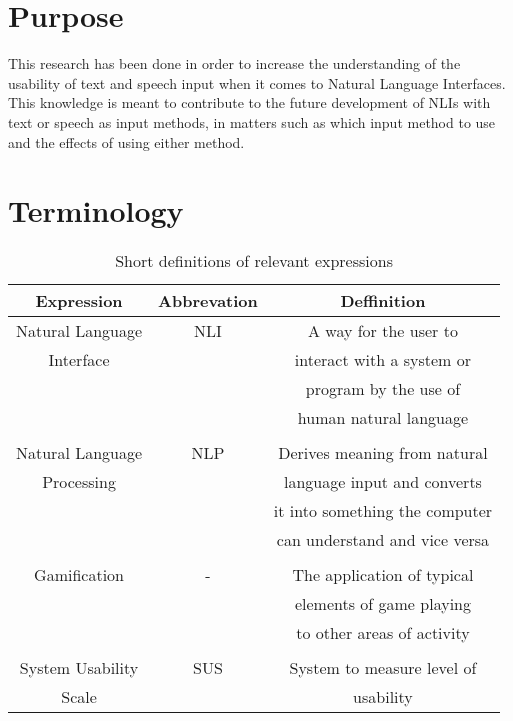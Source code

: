 \section{Purpose}
This research has been done in order to increase the understanding of the usability of text and speech input when it comes to Natural Language Interfaces. This knowledge is meant to contribute to the future development of NLIs with text or speech as input methods, in matters such as which input method to use and the effects of using either method.


\section{Terminology}

\begin{table}[ht]
  \centering
  \begin{tabular}{ccc}
    \toprule
    Expression & Abbrevation & Deffinition\\
    \midrule
    Natural Language & NLI & A way for the user to\\
    Interface & & interact with a system or\\ 
    & & program by the use of\\
    & & human natural language\\
    \\
    Natural Language & NLP & Derives meaning from natural\\
    Processing & & language input and converts\\
    & & it into something the computer\\
    & & can understand and vice versa\\
    \\
    Gamification & - & The application of typical\\
    & & elements of game playing\\
    & & to other areas of activity \\
    \\
    System Usability & SUS & System to measure level of\\
    Scale & &  usability\\
    \bottomrule
  \end{tabular}
  \caption{Short definitions of relevant expressions}\label{termin}
\end{table}